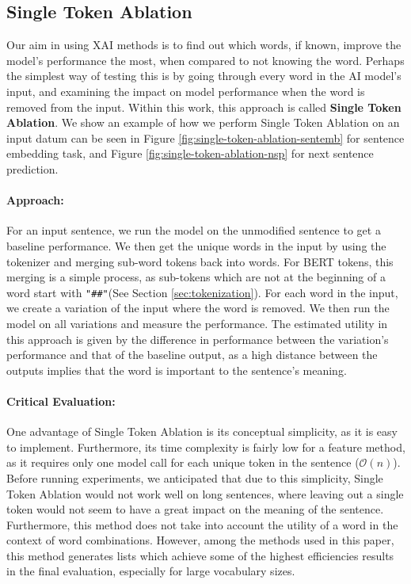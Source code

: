 \subsection{Single Token Ablation}
Our aim in using XAI methods is to find out which words, if known, improve the model's performance the most, when compared to not knowing the word.
Perhaps the simplest way of testing this is by going through every word in the AI model's input, and examining the impact on model performance when the word is removed from the input.
Within this work, this approach is called \textbf{Single Token Ablation}.
We show an example of how we perform Single Token Ablation on an input datum can be seen in Figure \ref{fig:single-token-ablation-sentemb} for sentence embedding task, and Figure \ref{fig:single-token-ablation-nsp} for next sentence prediction.

\paragraph{Approach:}
For an input sentence, we run the model on the unmodified sentence to get a baseline performance.
We then get the unique words in the input by using the tokenizer and merging sub-word tokens back into words.
For BERT tokens, this merging is a simple process, as sub-tokens which are not at the beginning of a word start with \texttt{"\#\#"}(See Section \ref{sec:tokenization}).
For each word in the input, we create a variation of the input where the word is removed.
We then run the model on all variations and measure the performance.
The estimated utility in this approach is given by the difference in performance between the variation's performance and that of the baseline output, as a high distance between the outputs implies that the word is important to the sentence's meaning.

\paragraph{Critical Evaluation:}
One advantage of Single Token Ablation is its conceptual simplicity, as it is easy to implement.
Furthermore, its time complexity is fairly low for a feature method, as it requires only one model call for each unique token in the sentence ($\mathcal{O}(n)$).
Before running experiments, we anticipated that due to this simplicity, Single Token Ablation would not work well on long sentences, where leaving out a single token would not seem to have a great impact on the meaning of the sentence.
Furthermore, this method does not take into account the utility of a word in the context of word combinations.
However, among the methods used in this paper, this method generates lists which achieve some of the highest efficiencies results in the final evaluation, especially for large vocabulary sizes.

